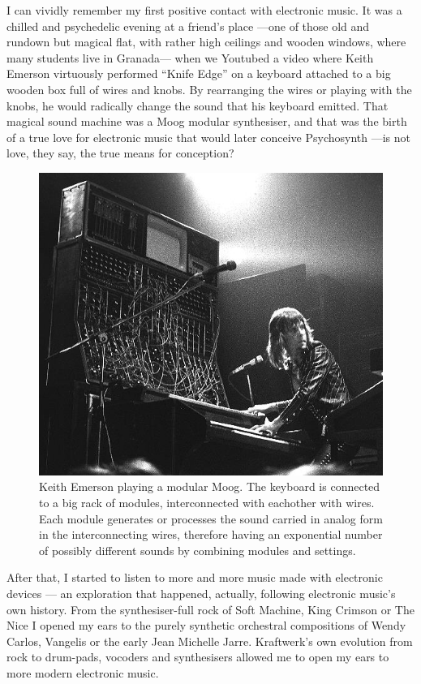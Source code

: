 I can vividly remember my first positive contact with electronic
music. It was a chilled and psychedelic evening at a friend's place
---one of those old and rundown but magical flat, with rather high
ceilings and wooden windows, where many students live in Granada---
when we Youtubed a video where Keith Emerson virtuously performed
``Knife Edge'' on a keyboard attached to a big wooden box full of
wires and knobs. By rearranging the wires or playing with the knobs,
he would radically change the sound that his keyboard
emitted. That magical sound machine was a Moog modular synthesiser,
and that was the birth of a true love for electronic music that would
later conceive Psychosynth ---is not love, they say, the true means
for conception?

\begin{figure}[h!]
  \centering
  \includegraphics[width=.7\textwidth]{pic/elpmoog.jpg}
  \caption[Keith Emerson playing a modular Moog]{Keith Emerson playing
    a modular Moog. The keyboard is connected to a big rack of
    modules, interconnected with eachother with wires. Each module
    generates or processes the sound carried in analog form in the
    interconnecting wires, therefore having an exponential number of
    possibly different sounds by combining modules and settings.}
\end{figure}

After that, I started to listen to more and more music made with
electronic devices --- an exploration that happened, actually,
following electronic music's own history. From the synthesiser-full
rock of Soft Machine, King Crimson or The Nice I opened my ears to the
purely synthetic orchestral compositions of Wendy Carlos, Vangelis or
the early Jean Michelle Jarre. Kraftwerk's own evolution from rock to
drum-pads, vocoders and synthesisers allowed me to open my ears to
more modern electronic music.

